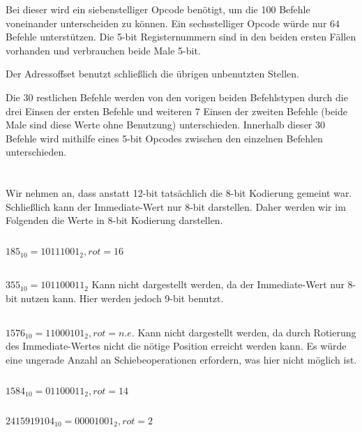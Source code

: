 \documentclass[10pt,a4paper,oneside,ngerman,numbers=noenddot]{scrartcl}
\begin{document}
Bei dieser wird ein siebenstelliger Opcode benötigt, um die 100 Befehle voneinander unterscheiden zu können. Ein sechsstelliger Opcode würde nur $64$ Befehle unterstützen.
Die 5-bit Registernummern sind in den beiden ersten Fällen vorhanden und verbrauchen beide Male 5-bit.

Der Adressoffset benutzt schließlich die übrigen unbenutzten Stellen.

Die 30 restlichen Befehle werden von den vorigen beiden Befehlstypen durch die drei Einsen der ersten Befehle und weiteren 7 Einsen der zweiten Befehle (beide Male sind diese Werte ohne Benutzung) unterschieden. Innerhalb dieser 30 Befehle wird mithilfe eines 5-bit Opcodes zwischen den einzelnen Befehlen unterschieden.
\section{} %
Wir nehmen an, dass anstatt 12-bit tatsächlich die 8-bit Kodierung gemeint war. Schließlich kann der Immediate-Wert nur 8-bit darstellen. Daher werden wir im Folgenden die Werte in 8-bit Kodierung darstellen.
\subsection{} %
$185_{10} = 10111001_{2}, rot = 16$
\subsection{} %
$355_{10} = 101100011_{2}$ 
Kann nicht dargestellt werden, da der Immediate-Wert nur 8-bit nutzen kann. Hier werden jedoch 9-bit benutzt.
\subsection{} %
$1576_{10} = 11000101_{2}, rot = n.e.$
Kann nicht dargestellt werden, da durch Rotierung des Immediate-Wertes nicht die nötige Position erreicht werden kann. Es würde eine ungerade Anzahl an Schiebeoperationen erfordern, was hier nicht möglich ist.
\subsection{} %
$1584_{10} = 01100011_{2}, rot = 14$
\subsection{} %
$2415919104_{10} = 00001001_{2}, rot = 2$
\section{} %
\end{document}

